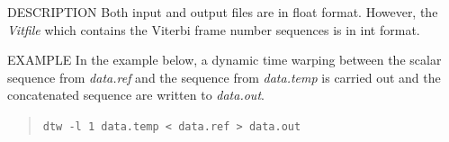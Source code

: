 \begin{qsection}{DESCRIPTION}
 Both input and output files are in float format. However,
 the {\em Vitfile} which contains the Viterbi frame number
 sequences is in int format.
\end{qsection}
\begin{options}
\end{options}

\begin{qsection}{EXAMPLE}
 In the example below, a dynamic time warping between the scalar
 sequence from {\em data.ref} and
 the sequence from {\em data.temp} is carried out and
 the concatenated sequence are written to {\em data.out}.
\begin{quote}
 \verb!dtw -l 1 data.temp < data.ref > data.out!
\end{quote}
\end{qsection}

